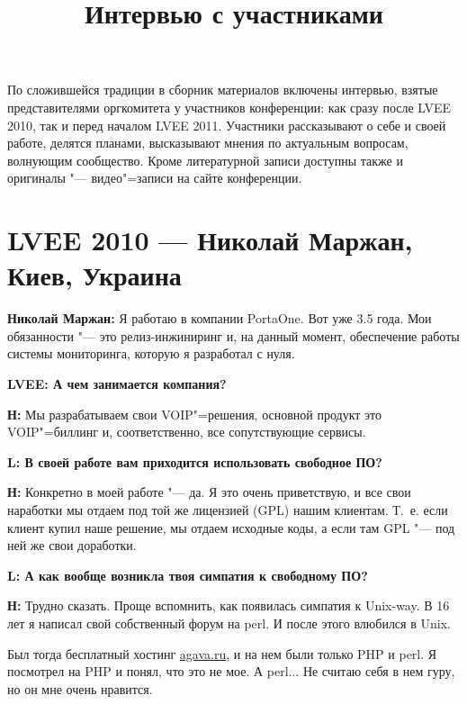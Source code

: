 \documentclass[10pt, a5paper]{article}
\begin{document}
\title{Интервью с участниками}
\date{}
\maketitle

По сложившейся традиции в сборник материалов включены интервью, взятые представителями оргкомитета у участников конференции: как сразу после LVEE 2010, так и перед началом LVEE 2011. Участники рассказывают о себе и своей работе, делятся планами, высказывают мнения по актуальным вопросам, волнующим сообщество. Кроме литературной записи доступны также и оригиналы "--- видео"=записи на сайте конференции.

\section*{\flushleft LVEE 2010 --- Николай Маржан, \linebreak Киев, Украина}

{\noindent \bf Николай Маржан:} Я работаю в компании PortaOne. Вот уже 3.5 года. Мои обязанности "--- это релиз-инжиниринг и, на данный момент, обеспечение работы системы мониторинга, которую я разработал с нуля.

{\noindent \bf LVEE: А чем занимается компания?}

{\noindent \bf Н:} Мы разрабатываем свои VOIP"=решения, основной продукт это VOIP"=биллинг и, соответственно, все сопутствующие сервисы.

{\noindent \bf L: В своей работе вам приходится использовать свободное ПО?}

{\noindent \bf Н:} Конкретно в моей работе "--- да. Я это очень приветствую, и все свои наработки мы отдаем под той же лицензией (GPL) нашим клиентам. Т.~е. если клиент купил наше решение, мы отдаем исходные коды, а если там GPL "--- под ней же свои доработки.

{\noindent \bf L: А как вообще возникла твоя симпатия к свободному ПО?}

{\noindent \bf Н:} Трудно сказать. Проще вспомнить, как появилась симпатия к Unix-way. В 16 лет я написал свой собственный форум на perl. И после этого влюбился в Unix. 

Был тогда бесплатный хостинг \url{agava.ru}, и на нем были только PHP и perl. Я посмотрел на PHP и понял, что это не мое. А perl... Не считаю себя в нем гуру, но он мне очень нравится. 
\end{document}
